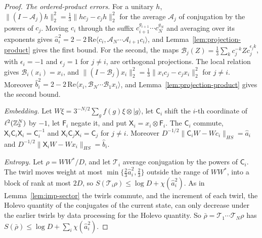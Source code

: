 \begin{proof}
\emph{The ordered-product errors.} For a unitary $h$, $\|(I-\mathcal A_j)h\|_2^2=\frac13\|hc_j-c_jh\|_2^2$ for the average $\mathcal A_j$ of conjugation by
the powers of $c_j$. Moving $c_i$ through the suffix $c_{i+1}^{g_{i+1}}\cdots c_N^{g_N}$ and averaging over its exponents gives
$\hat a_i^2=2-2\,\mathrm{Re}\langle c_i,\mathcal A_N\cdots\mathcal A_{i+1}c_i\rangle$, and Lemma~\ref{lem:projection-product} gives the first bound. For the
second, the maps $\mathcal B_j(Z)=\frac13\sum_kc_j^{-k}Zc_j^{\epsilon_jk}$, with $\epsilon_i=-1$ and $\epsilon_j=1$ for $j\ne i$, are orthogonal
projections. The local relation gives $\mathcal B_i(x_i)=x_i$, and $\|(I-\mathcal B_j)x_i\|_2^2=\frac13\|x_ic_j-c_jx_i\|_2^2$ for $j\ne i$. Moreover
$\hat b_i^2=2-2\,\mathrm{Re}\langle x_i,\mathcal B_N\cdots\mathcal B_1x_i\rangle$, and Lemma~\ref{lem:projection-product} gives the second bound.

\emph{Embedding.} Let $W\xi=3^{-N/2}\sum_gf(g)\xi\otimes|g\rangle$, let $\mathsf C_i$ shift the $i$-th coordinate of $\ell^2(\mathbb Z_3^N)$ by $-1$, let
$\mathsf F_i$ negate it, and put $\mathsf X_i=x_i\otimes\mathsf F_i$. The $\mathsf C_i$ commute, $\mathsf X_i\mathsf C_i\mathsf X_i=\mathsf C_i^{-1}$ and
$\mathsf X_i\mathsf C_j\mathsf X_i=\mathsf C_j$ for $j\ne i$. Moreover $D^{-1/2}\|\mathsf C_iW-Wc_i\|_{HS}=\hat a_i$ and
$D^{-1/2}\|\mathsf X_iW-Wx_i\|_{HS}=\hat b_i$.

\emph{Entropy.} Let $\rho=WW^*/D$, and let $\mathcal T_i$ average conjugation by the powers of $\mathsf C_i$. The twirl moves weight at most
$\min\{\frac23\hat a_i^2,\frac23\}$ outside the range of $WW^*$, into a block of rank at most $2D$, so $S(\mathcal T_i\rho)\le\log D+\chi(\hat a_i^2)$. As in
Lemma~\ref{lem:imp-sector} the twirls commute, and the increment of each twirl, the Holevo quantity of the conjugates of the current state, can
only decrease under the earlier twirls by data processing for the Holevo quantity. So $\bar\rho=\mathcal T_1\cdots\mathcal T_N\rho$ has
$S(\bar\rho)\le\log D+\sum_i\chi(\hat a_i^2)$.


\end{proof}
